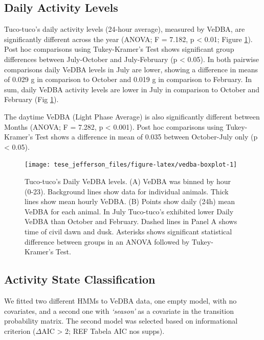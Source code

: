 \documentclass[english,msc,numbers,hidelinks]{coppe}
\begin{document}
  \hypertarget{daily-activity-levels}{%
  \subsection{Daily Activity Levels}\label{daily-activity-levels}}

  Tuco-tuco's daily activity levels (24-hour average), measured by VeDBA, are significantly different across the year (ANOVA; F = 7.182, p \textless{} 0.01; Figure \ref{fig:vedba-boxplot}). Post hoc comparisons using Tukey-Kramer's Test shows significant group differences between July-October and July-February (p \textless{} 0.05). In both pairwise comparisons daily VeDBA levels in July are lower, showing a difference in means of 0.029 g in comparison to October and 0.019 g in comparison to February. In sum, daily VeDBA activity levels are lower in July in comparison to October and February (Fig \ref{fig:vedba-boxplot}).

  The daytime VeDBA (Light Phase Average) is also significantly different between Months (ANOVA; F = 7.282, p \textless{} 0.001). Post hoc comparisons using Tukey-Kramer's Test shows a difference in mean of 0.035 between October-July only (p \textless{} 0.05).
  \begin{figure}

  {\centering \texttt{[image: tese\_jefferson\_files/figure-latex/vedba-boxplot-1]} 

  }

  \caption{Tuco-tuco's Daily VeDBA levels. (A) VeDBA was binned by hour (0-23). Background lines show data for individual animals. Thick lines show mean hourly VeDBA. (B) Points show daily (24h) mean VeDBA for each animal. In July Tuco-tuco's exhibited lower Daily VeDBA than October and February. Dashed lines in Panel A shows time of civil dawn and dusk. Asterisks shows significant statistical difference between groups in an ANOVA followed by Tukey-Kramer's Test.}\label{fig:vedba-boxplot}
  \end{figure}
  \hypertarget{activity-state-classification}{%
  \subsection{Activity State Classification}\label{activity-state-classification}}

  We fitted two different HMMs to VeDBA data, one empty model, with no covariates, and a second one with \emph{`season'} as a covariate in the transition probability matrix. The second model was selected based on informational criterion (\(\Delta\)AIC \textgreater{} 2; REF Tabela AIC nos supps).
\end{document}
